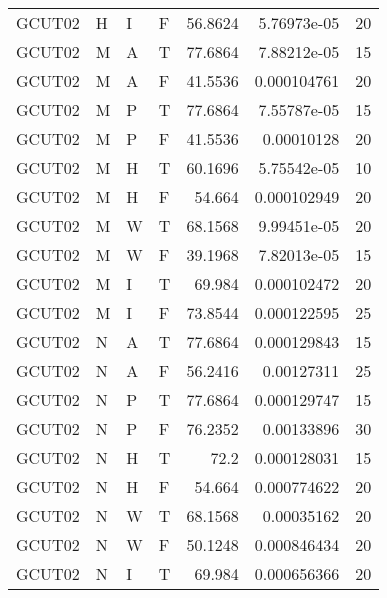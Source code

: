 \begin{longtable}{llllrrr}
    GCUT02   & H         & I         & F          & 56.8624    & 5.76973e-05 & 20       \\
    GCUT02   & M         & A         & T          & 77.6864    & 7.88212e-05 & 15       \\
    GCUT02   & M         & A         & F          & 41.5536    & 0.000104761 & 20       \\
    GCUT02   & M         & P         & T          & 77.6864    & 7.55787e-05 & 15       \\
    GCUT02   & M         & P         & F          & 41.5536    & 0.00010128  & 20       \\
    GCUT02   & M         & H         & T          & 60.1696    & 5.75542e-05 & 10       \\
    GCUT02   & M         & H         & F          & 54.664     & 0.000102949 & 20       \\
    GCUT02   & M         & W         & T          & 68.1568    & 9.99451e-05 & 20       \\
    GCUT02   & M         & W         & F          & 39.1968    & 7.82013e-05 & 15       \\
    GCUT02   & M         & I         & T          & 69.984     & 0.000102472 & 20       \\
    GCUT02   & M         & I         & F          & 73.8544    & 0.000122595 & 25       \\
    GCUT02   & N         & A         & T          & 77.6864    & 0.000129843 & 15       \\
    GCUT02   & N         & A         & F          & 56.2416    & 0.00127311  & 25       \\
    GCUT02   & N         & P         & T          & 77.6864    & 0.000129747 & 15       \\
    GCUT02   & N         & P         & F          & 76.2352    & 0.00133896  & 30       \\
    GCUT02   & N         & H         & T          & 72.2       & 0.000128031 & 15       \\
    GCUT02   & N         & H         & F          & 54.664     & 0.000774622 & 20       \\
    GCUT02   & N         & W         & T          & 68.1568    & 0.00035162  & 20       \\
    GCUT02   & N         & W         & F          & 50.1248    & 0.000846434 & 20       \\
    GCUT02   & N         & I         & T          & 69.984     & 0.000656366 & 20       \\

\end{longtable}
